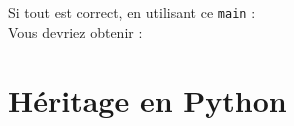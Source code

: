 Si tout est correct, en utilisant ce \lstinline{main} : \\

 

Vous devriez obtenir : \\

 

\section{Héritage en Python \optionnel}


